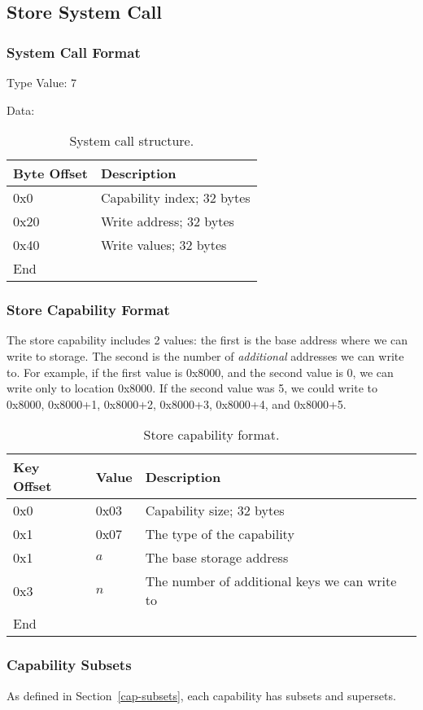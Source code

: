 \documentclass[english,a4paper]{article}
\let\oldparagraph\subsubsection
\renewcommand{\subsubsection}[1]{\oldparagraph{#1}\mbox{}}
\begin{document}
\subsection{Store System Call}

\subsubsection{System Call Format}
Type Value: 7

Data:

\begin{table}[H]
  \caption{System call structure.}
  \centering{}%
  \begin{tabular}{l|p{}}
    \hline
    Byte Offset & Description\tabularnewline
    \hline
    \hline
    0x0 & Capability index; 32 bytes \tabularnewline
    0x20 & Write address; 32 bytes \tabularnewline
    0x40 & Write values; 32 bytes \tabularnewline
    \hline
    End &  \tabularnewline
    \hline
  \end{tabular}
\end{table}

\subsubsection{Store Capability Format}
The store capability includes 2 values: the first is the base address where we
can write to storage. The second is the number of \emph{additional} addresses we
can write to. For example, if the first value is 0x8000, and the second value is
0, we can write only to location 0x8000. If the second value was 5, we could
write to 0x8000, 0x8000+1, 0x8000+2, 0x8000+3, 0x8000+4, and 0x8000+5.

\begin{table}[H]
  \caption{Store capability format.}
  \centering{}%
  \begin{tabular}{l|l|p{}}
    \hline
    Key Offset & Value & Description\tabularnewline
    \hline
    \hline
    0x0 & 0x03 & Capability size; 32 bytes \tabularnewline
    0x1 & 0x07 & The type of the capability \tabularnewline
    0x1 & $a$ & The base storage address\tabularnewline
    0x3 & $n$ & The number of additional keys we can write to\tabularnewline
    \hline
    End &  \tabularnewline
    \hline
  \end{tabular}
\end{table}

\subsubsection{Capability Subsets}
As defined in Section~\ref{cap-subsets}, each capability has subsets and
supersets.
\end{document}
